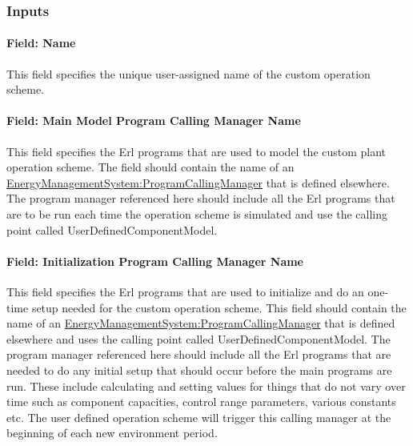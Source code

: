 \subsubsection{Inputs}\label{inputs-1-047}

\paragraph{Field: Name}\label{field-name-4-032}

This field specifies the unique user-assigned name of the custom operation scheme.

\paragraph{Field: Main Model Program Calling Manager Name}\label{field-main-model-program-calling-manager-name-1}

This field specifies the Erl programs that are used to model the custom plant operation scheme. The field should contain the name of an \hyperref[energymanagementsystemprogramcallingmanager]{\hyperref[energymanagementsystemprogram]{EnergyManagementSystem:Program}CallingManager} that is defined elsewhere. The program manager referenced here should include all the Erl programs that are to be run each time the operation scheme is simulated and use the calling point called UserDefinedComponentModel.

\paragraph{Field: Initialization Program Calling Manager Name}\label{field-initialization-program-calling-manager-name}

This field specifies the Erl programs that are used to initialize and do an one-time setup needed for the custom operation scheme. This field should contain the name of an \hyperref[energymanagementsystemprogramcallingmanager]{\hyperref[energymanagementsystemprogram]{EnergyManagementSystem:Program}CallingManager} that is defined elsewhere and uses the calling point called UserDefinedComponentModel. The program manager referenced here should include all the Erl programs that are needed to do any initial setup that should occur before the main programs are run. These include calculating and setting values for things that do not vary over time such as component capacities, control range parameters, various constants etc. The user defined operation scheme will trigger this calling manager at the beginning of each new environment period.


